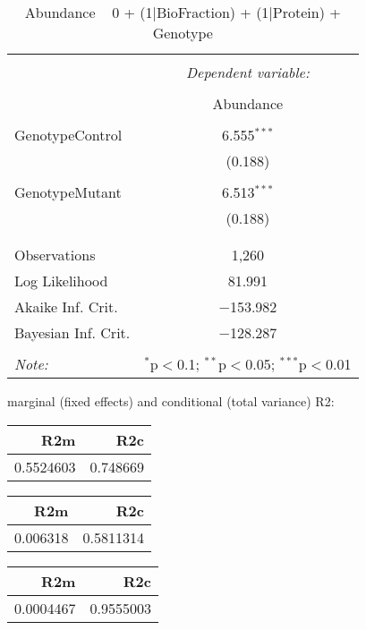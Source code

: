 \documentclass[11pt]{report}
\begin{document}
\begin{table}[!htbp] \centering 
  \caption{Abundance ~ 0 + (1|BioFraction) + (1|Protein) + Genotype} 
  \label{} 
\begin{tabular}{@{\extracolsep{5pt}}lc} 
\\[-1.8ex]\hline 
\hline \\[-1.8ex] 
 & \multicolumn{1}{c}{\textit{Dependent variable:}} \\ 
\cline{2-2} 
\\[-1.8ex] & Abundance \\ 
\hline \\[-1.8ex] 
 GenotypeControl & 6.555$^{***}$ \\ 
  & (0.188) \\ 
  & \\ 
 GenotypeMutant & 6.513$^{***}$ \\ 
  & (0.188) \\ 
  & \\ 
\hline \\[-1.8ex] 
Observations & 1,260 \\ 
Log Likelihood & 81.991 \\ 
Akaike Inf. Crit. & $-$153.982 \\ 
Bayesian Inf. Crit. & $-$128.287 \\ 
\hline 
\hline \\[-1.8ex] 
\textit{Note:}  & \multicolumn{1}{r}{$^{*}$p$<$0.1; $^{**}$p$<$0.05; $^{***}$p$<$0.01} \\ 
\end{tabular} 
\end{table} 
marginal (fixed effects) and conditional (total variance) R2:

\begin{tabular}{r|r}
\hline
R2m & R2c\\
\hline
0.5524603 & 0.748669\\
\hline
\end{tabular}

\begin{tabular}{r|r}
\hline
R2m & R2c\\
\hline
0.006318 & 0.5811314\\
\hline
\end{tabular}

\begin{tabular}{r|r}
\hline
R2m & R2c\\
\hline
0.0004467 & 0.9555003\\
\hline
\end{tabular}
\end{document}

